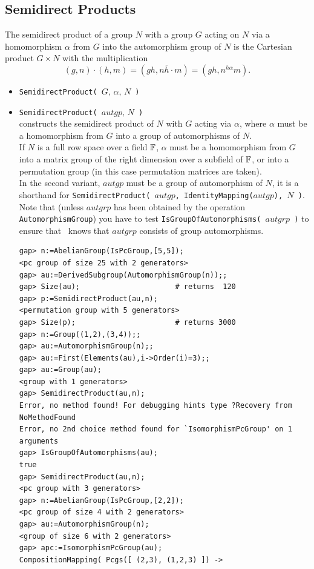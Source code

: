 \subsection{Semidirect Products}
The semidirect product of a group $N$
with a group $G$ acting on $N$ via a homomorphism $\alpha$ from $G$ into
the automorphism group of $N$ is the Cartesian product $G \times N$ with the
multiplication 
\[
(g, n) \cdot (h, m) = (gh, n\bar{h} \cdot m)= (gh, n^{h\alpha} m).
\]
\begin{itemize}
\item {\tt SemidirectProduct( $G, \, \alpha, \, N$ )}
\item {\tt SemidirectProduct( $autgp, \, N$ )}\\[2pt]
constructs the semidirect product of $N$ with $G$ acting via $\alpha$, where $\alpha$
must be a homomorphism from $G$ into a group of automorphisms of $N$.
\\[5pt]
If $N$ is a full row space over a field $\mathbb{F}$, $\alpha$ must be a homomorphism from
$G$ into a matrix group of the right dimension over a subfield of $\mathbb{F}$, or into a
permutation group (in this case permutation matrices are taken).
\\[5pt]
In the second variant, $autgp$ must be a group of automorphism of $N$, it is a
shorthand for {\tt SemidirectProduct( $autgp$, IdentityMapping($autgp$), $N$ )}. Note
that (unless $autgrp$ has been obtained by the operation  {\tt AutomorphismGroup})
you have to test {\tt IsGroupOfAutomorphisms( $autgrp$ )} to ensure that \gap\ knows that 
$autgrp$ consists of group automorphisms.
{\codesize
\begin{verbatim}
gap> n:=AbelianGroup(IsPcGroup,[5,5]);
<pc group of size 25 with 2 generators>
gap> au:=DerivedSubgroup(AutomorphismGroup(n));;
gap> Size(au);                      # returns  120
gap> p:=SemidirectProduct(au,n);
<permutation group with 5 generators>
gap> Size(p);                       # returns 3000
gap> n:=Group((1,2),(3,4));;
gap> au:=AutomorphismGroup(n);;
gap> au:=First(Elements(au),i->Order(i)=3);;
gap> au:=Group(au);
<group with 1 generators>
gap> SemidirectProduct(au,n);
Error, no method found! For debugging hints type ?Recovery from NoMethodFound
Error, no 2nd choice method found for `IsomorphismPcGroup' on 1 arguments
gap> IsGroupOfAutomorphisms(au);
true
gap> SemidirectProduct(au,n);
<pc group with 3 generators>
gap> n:=AbelianGroup(IsPcGroup,[2,2]);
<pc group of size 4 with 2 generators>
gap> au:=AutomorphismGroup(n);
<group of size 6 with 2 generators>
gap> apc:=IsomorphismPcGroup(au);
CompositionMapping( Pcgs([ (2,3), (1,2,3) ]) ->

\end{verbatim}}
\end{itemize}
